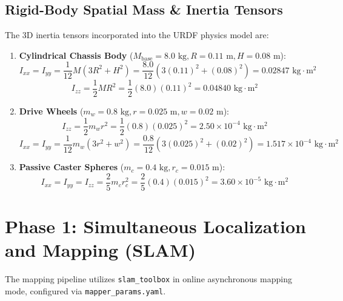 \documentclass[10pt,a4paper]{article}
\begin{document}
\subsection{Rigid-Body Spatial Mass \& Inertia Tensors}
The 3D inertia tensors incorporated into the URDF physics model are:
\begin{enumerate}
    \item \textbf{Cylindrical Chassis Body} ($M_{\text{base}} = 8.0\text{ kg}, R = 0.11\text{ m}, H = 0.08\text{ m}$):
    \begin{equation}
    I_{xx} = I_{yy} = \frac{1}{12}M(3R^2 + H^2) = \frac{8.0}{12}(3(0.11)^2 + (0.08)^2) = 0.02847\text{ kg}\cdot\text{m}^2
    \end{equation}
    \begin{equation}
    I_{zz} = \frac{1}{2}M R^2 = \frac{1}{2}(8.0)(0.11)^2 = 0.04840\text{ kg}\cdot\text{m}^2
    \end{equation}
    \item \textbf{Drive Wheels} ($m_w = 0.8\text{ kg}, r = 0.025\text{ m}, w = 0.02\text{ m}$):
    \begin{equation}
    I_{zz} = \frac{1}{2}m_w r^2 = \frac{1}{2}(0.8)(0.025)^2 = 2.50 \times 10^{-4}\text{ kg}\cdot\text{m}^2
    \end{equation}
    \begin{equation}
    I_{xx} = I_{yy} = \frac{1}{12}m_w(3r^2 + w^2) = \frac{0.8}{12}(3(0.025)^2 + (0.02)^2) = 1.517 \times 10^{-4}\text{ kg}\cdot\text{m}^2
    \end{equation}
    \item \textbf{Passive Caster Spheres} ($m_c = 0.4\text{ kg}, r_c = 0.015\text{ m}$):
    \begin{equation}
    I_{xx} = I_{yy} = I_{zz} = \frac{2}{5}m_c r_c^2 = \frac{2}{5}(0.4)(0.015)^2 = 3.60 \times 10^{-5}\text{ kg}\cdot\text{m}^2
    \end{equation}
\end{enumerate}

\section{Phase 1: Simultaneous Localization and Mapping (SLAM)}

The mapping pipeline utilizes \texttt{slam\_toolbox} in online asynchronous mapping mode, configured via \texttt{mapper\_params.yaml}.
\end{document}
